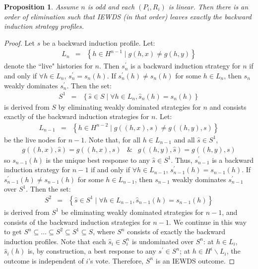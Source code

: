 \documentclass[12pt]{article}
\newtheorem{propo}{Proposition}[section]
\newcommand{\n}{\noindent}
\newcommand{\s}{\vspace{5mm}}
\begin{document}
\s
\n\begin{propo}  Assume $n$ is odd and each $(P_i,R_i)$ is linear.  Then there is an order of elimination such that IEWDS (in that order) leaves exactly the backward induction strategy profiles.
\end{propo}
\begin{proof}  Let $s$ be a backward induction profile.  Let:
\begin{eqnarray*}L_n&=&\left\{h\in H^{n-1} \mid g(h,x)\neq g(h,y) \right\}
\end{eqnarray*} denote the ``live" histories for $n$.  Then $s_n^{\prime}$ is a backward induction strategy for $n$ if and only if $\forall h\in L_n$, $s^{\prime}_n=s_n(h)$.  If $s_n^{\prime}(h)\neq s_n(h)$ for some $h\in L_n$, then $s_n$ weakly dominates $s_n^{\prime}$.  Then the set:
\begin{eqnarray*}
S^{1}&=&\left\{\widehat{s}\in S\mid \forall h\in L_n, \widehat{s}_n(h)=s_n(h)\right\}
\end{eqnarray*} is derived from $S$ by eliminating weakly dominated strategies for $n$ and consists exactly of the backward induction strategies for $n$.  Let: 
\begin{eqnarray*}
L_{n-1}&=&\left\{h\in H^{n-2}\mid g((h,x),s)\neq g((h,y),s)\right\}
\end{eqnarray*} be the live nodes for $n-1$.  Note that, for all $h\in L_{n-1}$ and all $\widehat{s}\in S^{1}$,
\begin{eqnarray*}
g((h,x),\widehat{s})=g((h,x),s)&\&&g((h,y),\widehat{s})=g((h,y),s)
\end{eqnarray*} so $s_{n-1}(h)$ is the unique best response to any $\widehat{s}\in S^{1}$.  Thus, $s^{\prime}_{n-1}$ is a backward induction strategy for $n-1$ if and only if $\forall h\in L_{n-1}$, $s^{\prime}_{n-1}(h)=s_{n-1}(h)$.  If $s^{\prime}_{n-1}(h)\neq s_{n-1}(h)$ for some $h\in L_{n-1}$, then $s_{n-1}$ weakly dominates $s_{n-1}^{\prime}$ over $S^{1}$.  Then the set:
\begin{eqnarray*}
S^2&=&\left\{\widehat{s}\in S^1\mid \forall h\in L_{n-1}, \widehat{s}_{n-1}(h)=s_{n-1}(h)\right\}
\end{eqnarray*} is derived from $S^1$ be eliminating weakly dominated strategies for $n-1$, and consists of the backward induction strategies for $n-1$.  We continue in this way to get $S^n\subseteq\hdots\subseteq S^2\subseteq S^1\subseteq S$, where $S^n$ consists of exactly the backward induction profiles.  Note that each $\widehat{s}_i\in S_i^n$ is undominated over $S^n$: at $h\in L_i$, $\widehat{s}_i(h)$ is, by construction, a best response to any $s^{\prime}\in S^n$; at $h\in H^i\backslash L_i$, the outcome is independent of $i$'s vote.  Therefore, $S^n$ is an IEWDS outcome.
\end{proof}
\end{document}
